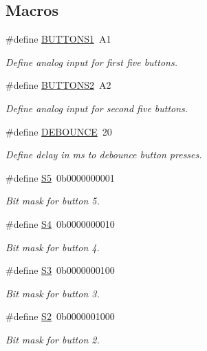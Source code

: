 \subsection*{Macros}
\begin{DoxyCompactItemize}
\item 
\#define \hyperlink{group__buttons_gab47d09cf51ee6fbdc1b7b255f57ec896}{B\+U\+T\+T\+O\+N\+S1}~A1
\begin{DoxyCompactList}\small\item\em Define analog input for first five buttons. \end{DoxyCompactList}\item 
\#define \hyperlink{group__buttons_gac3f0a90f8f8169f919f346be1ea485db}{B\+U\+T\+T\+O\+N\+S2}~A2
\begin{DoxyCompactList}\small\item\em Define analog input for second five buttons. \end{DoxyCompactList}\item 
\#define \hyperlink{group__buttons_ga171ef18ea7b584f85234640a918da857}{D\+E\+B\+O\+U\+N\+CE}~20
\begin{DoxyCompactList}\small\item\em Define delay in ms to debounce button presses. \end{DoxyCompactList}\item 
\#define \hyperlink{group__buttons_ga0dae655e00097db2f5737cef9f1fe1e6}{S5}~0b0000000001
\begin{DoxyCompactList}\small\item\em Bit mask for button 5. \end{DoxyCompactList}\item 
\#define \hyperlink{group__buttons_gac6dd50ea82e237280daf26bd9b562ba9}{S4}~0b0000000010
\begin{DoxyCompactList}\small\item\em Bit mask for button 4. \end{DoxyCompactList}\item 
\#define \hyperlink{group__buttons_gab29872af8ce9dc9463b7f7ecfbea02ae}{S3}~0b0000000100
\begin{DoxyCompactList}\small\item\em Bit mask for button 3. \end{DoxyCompactList}\item 
\#define \hyperlink{group__buttons_gad5e70dee3c36d645b0eb1743b8a7d2bf}{S2}~0b0000001000
\begin{DoxyCompactList}\small\item\em Bit mask for button 2. \end{DoxyCompactList}\item 

\end{DoxyCompactItemize}
